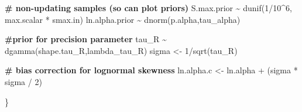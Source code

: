 \documentclass[french,11pt]{book}
\newenvironment{Shaded}{\begin{snugshade}}{\end{snugshade}}
\newcommand{\CommentTok}[1]{\textcolor[rgb]{0.56,0.35,0.01}{\textbf{#1}}}
\newcommand{\DecValTok}[1]{\textcolor[rgb]{0.00,0.00,0.81}{#1}}
\newcommand{\FunctionTok}[1]{\textcolor[rgb]{0.00,0.00,0.00}{#1}}
\newcommand{\NormalTok}[1]{#1}
\newcommand{\OtherTok}[1]{\textcolor[rgb]{0.56,0.35,0.01}{#1}}
\newcommand{\SpecialCharTok}[1]{\textcolor[rgb]{0.00,0.00,0.00}{#1}}
\begin{document}
\begin{Shaded}
\begin{Highlighting}[]
    
    \CommentTok{\# non{-}updating samples (so can plot priors)}
\NormalTok{    S.max.prior }\SpecialCharTok{\textasciitilde{}} \FunctionTok{dunif}\NormalTok{(}\DecValTok{1}\SpecialCharTok{/}\DecValTok{10}\SpecialCharTok{\^{}}\DecValTok{6}\NormalTok{, max.scalar }\SpecialCharTok{*}\NormalTok{ smax.in)}
\NormalTok{    ln.alpha.prior }\SpecialCharTok{\textasciitilde{}} \FunctionTok{dnorm}\NormalTok{(p.alpha,tau\_alpha)}
    
    \CommentTok{\#prior for precision parameter}
\NormalTok{    tau\_R }\SpecialCharTok{\textasciitilde{}} \FunctionTok{dgamma}\NormalTok{(shape.tau\_R,lambda\_tau\_R)  }
\NormalTok{    sigma }\OtherTok{\textless{}{-}} \DecValTok{1}\SpecialCharTok{/}\FunctionTok{sqrt}\NormalTok{(tau\_R)          }
    
    \CommentTok{\# bias correction for lognormal skewness}
\NormalTok{    ln.alpha.c }\OtherTok{\textless{}{-}}\NormalTok{ ln.alpha }\SpecialCharTok{+}\NormalTok{ (sigma }\SpecialCharTok{*}\NormalTok{ sigma }\SpecialCharTok{/} \DecValTok{2}\NormalTok{) }

\NormalTok{\}}
\end{Highlighting}
\end{Shaded}
\clearpage
\end{document}
